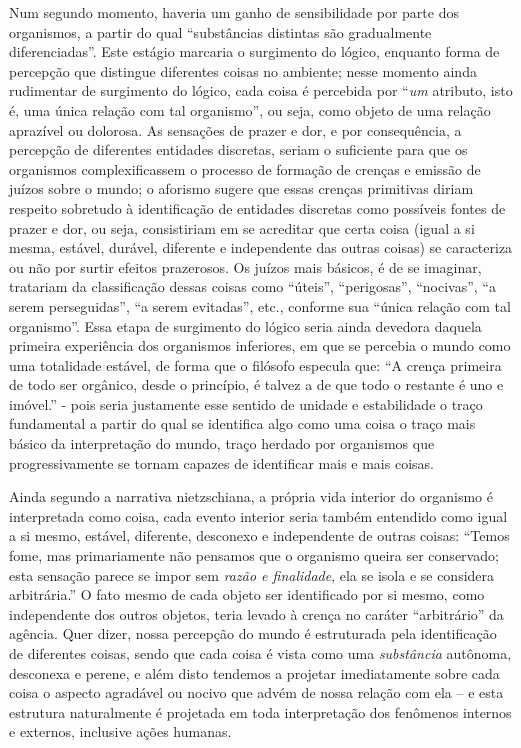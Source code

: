 \documentclass[
	12pt,				%
	openright,			%
	oneside,			%
	a4paper,			%
	english,			%
	french,				%
	spanish,			%
	brazil				%
	]{abntex2}
\begin{document}
Num segundo momento, haveria um ganho de sensibilidade por parte dos organismos, a partir do qual “substâncias distintas são gradualmente diferenciadas”. Este estágio marcaria o surgimento do lógico, enquanto forma de percepção que distingue diferentes coisas no ambiente; nesse momento ainda rudimentar de surgimento do lógico, cada coisa é percebida por “\textit{um} atributo, isto é, uma única relação com tal organismo”, ou seja, como objeto de uma relação aprazível ou dolorosa. As sensações de prazer e dor, e por consequência, a percepção de diferentes entidades discretas, seriam o suficiente para que os organismos complexificassem o processo de formação de crenças e emissão de juízos sobre o mundo; o aforismo sugere que essas crenças primitivas diriam respeito sobretudo à identificação de entidades discretas como possíveis fontes de prazer e dor, ou seja, consistiriam em se acreditar que certa coisa (igual a si mesma, estável, durável, diferente e independente das outras coisas) se caracteriza ou não por surtir efeitos prazerosos. Os juízos mais básicos, é de se imaginar, tratariam da classificação dessas coisas como “úteis”, “perigosas”, “nocivas”, “a serem perseguidas”, “a serem evitadas”, etc., conforme sua “única relação com tal organismo”. Essa etapa de surgimento do lógico seria ainda devedora daquela primeira experiência dos organismos inferiores, em que se percebia o mundo como uma totalidade estável, de forma que o filósofo especula que: “A crença primeira de todo ser orgânico, desde o princípio, é talvez a de que todo o restante é uno e imóvel.” - pois seria justamente esse sentido de unidade e estabilidade o traço fundamental a partir do qual se identifica algo como uma coisa o traço mais básico da interpretação do mundo, traço herdado por organismos que progressivamente se tornam capazes de identificar mais e mais coisas. 

Ainda segundo a narrativa nietzschiana, a própria vida interior do organismo é interpretada como coisa, cada evento interior seria também entendido como igual a si mesmo, estável, diferente, desconexo e independente de outras coisas: “Temos fome, mas primariamente não pensamos que o organismo queira ser conservado; esta sensação parece se impor sem \textit{razão e finalidade}, ela se isola e se considera arbitrária.” O fato mesmo de cada objeto ser identificado por si mesmo, como independente dos outros objetos, teria levado à crença no caráter “arbitrário” da agência. Quer dizer, nossa percepção do mundo é estruturada pela identificação de diferentes coisas, sendo que cada coisa é vista como uma \textit{substância} autônoma, desconexa e perene, e além disto tendemos a  projetar imediatamente sobre cada coisa o aspecto agradável ou nocivo que advém de nossa relação com ela – e esta estrutura naturalmente é projetada em toda interpretação dos fenômenos internos e externos, inclusive ações humanas.
\end{document}
